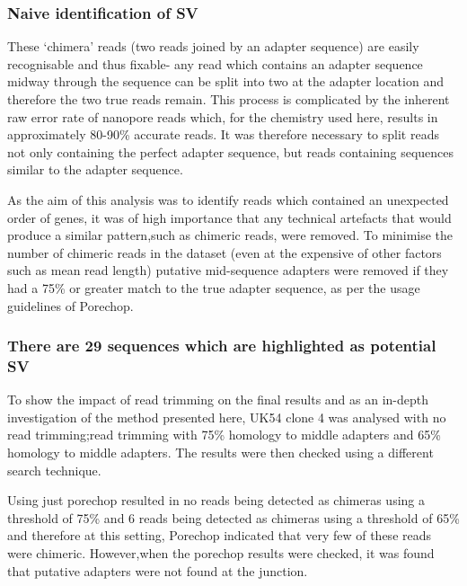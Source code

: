 
\subsubsection{Naive identification of SV}


These `chimera' reads (two reads joined by an adapter sequence) are easily recognisable and thus fixable- any read which contains an adapter sequence midway through the sequence can be split into two at the adapter location and therefore the two true reads remain. This process is complicated by the inherent raw error rate of nanopore reads which, for the chemistry used here, results in approximately 80-90\% accurate reads. It was therefore necessary to split reads not only containing the perfect adapter sequence, but reads containing sequences similar to the adapter sequence.


As the aim of this analysis was to identify reads which contained an unexpected order of genes, it was of high importance that any technical artefacts that would produce a similar pattern,such as chimeric reads, were removed. To minimise the number of chimeric reads in the dataset (even at the expensive of other factors such as mean read length) putative mid-sequence adapters were removed if they had a 75\% or greater match to the true adapter sequence, as per the usage guidelines of Porechop. 


\subsubsection{There are 29 sequences which are highlighted as potential SV}

To show the impact of read trimming on the final results and as an in-depth investigation of the method presented here, UK54 clone 4 was analysed with no read trimming;read trimming with 75\% homology to middle adapters and 65\% homology to middle adapters. The results were then checked using a different search technique.

Using just porechop resulted in no reads being detected as chimeras using a threshold of 75\% and 6 reads being detected as chimeras using a threshold of 65\% and therefore at this setting, Porechop indicated that very few of these reads were chimeric. However,when the porechop results were checked, it was found that putative adapters were not found at the junction.


